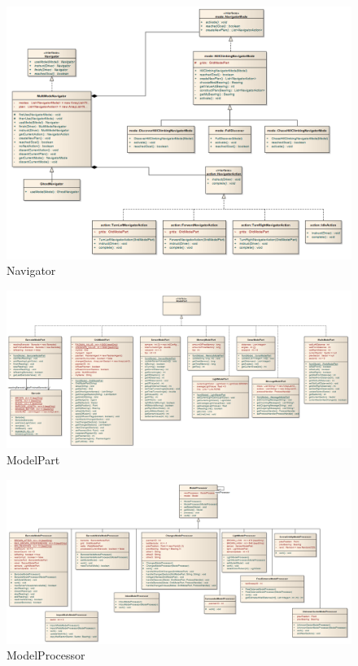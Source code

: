 \documentclass[12pt,a4paper]{report}
\begin{document}
\begin{figure}[htbp]
  \centering
  \includegraphics[width=200mm, angle=90]{resources/model-navigator2.png}
  \caption{Navigator}
  \label{uml:navigator}
\end{figure}

\begin{figure}[htbp]
  \centering
  \includegraphics[width=200mm, angle=90]{resources/model-modelpart2.png}
  \caption{ModelPart}
  \label{uml:modelpart}
\end{figure}

\begin{figure}[htbp]
  \centering
  \includegraphics[width=200mm, angle=90]{resources/model-modelprocessor2.png}
  \caption{ModelProcessor}
  \label{uml:modelprocessor}
\end{figure}
\end{document}
